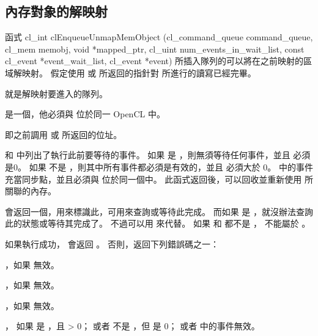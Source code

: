 \subsection{內存對象的解映射}
函式
\startCLFUNC
cl_int clEnqueueUnmapMemObject (cl_command_queue command_queue,
			cl_mem memobj,
			void *mapped_ptr,
			cl_uint num_events_in_wait_list,
			const cl_event *event_wait_list,
			cl_event *event)
\stopCLFUNC
所插入隊列的可以將在之前映射的區域解映射。
假定使用  或  所返回的指針對  所進行的讀寫已經完畢。

 就是解映射要進入的隊列。

 是一個，他必須與  位於同一 OpenCL 中。

 即之前調用  或  所返回的位址。

 和  中列出了執行此前要等待的事件。
如果  是 ，則無須等待任何事件，並且  必須是0。
如果  不是 ，則其中所有事件都必須是有效的，並且  必須大於 0。
 中的事件充當同步點，並且必須與  位於同一個中。
此函式返回後，可以回收並重新使用  所關聯的內存。

 會返回一個，用來標識此，可用來查詢或等待此完成。
而如果  是 ，就沒辦法查詢此的狀態或等待其完成了。
不過可以用  來代替。
如果  和  都不是 ，  不能屬於 。

如果執行成功，  會返回 。
否則，返回下列錯誤碼之一：
\startigBase
\item {}，如果  無效。
\item {}，如果  無效。

\item {}，如果  無效。

\item {}，
  如果  是 ，且  > 0；
  或者  不是 ，但  是 0；
  或者  中的事件無效。

